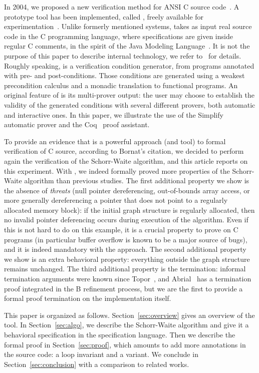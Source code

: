 In 2004, we proposed a new verification method for ANSI C source
code~\cite{filliatre04icfem}.  A prototype tool has been implemented,
called \caduceus{}, freely available for
experimentation~\cite{Caduceus}. Unlike formerly mentioned systems,
\caduceus{} takes as input real source code in the C programming
language, where specifications are given inside regular C comments, in
the spirit of the Java Modeling Language~\cite{leavens00jml}. It is
not the purpose of this paper to describe \caduceus{} internal
technology, we refer to~\cite{filliatre04icfem} for details. Roughly
speaking, \caduceus{} is a verification condition generator, from
programs annotated with pre- and post-conditions. Those conditions are
generated using a weakest precondition calculus and a monadic
translation to functional programs. An original feature of \caduceus{}
is its multi-prover output: the user may choose to establish the
validity of the generated conditions with several different provers,
both automatic and interactive ones. In this paper, we illustrate the
use of the Simplify~\cite{simplify} automatic prover and the
Coq~\cite{CoqProofAssistant} proof assistant.

To provide an evidence that \caduceus{} is a powerful approach (and
tool) to formal verification of C source, according to Bornat's
citation, we decided to perform again the verification of the
Schorr-Waite algorithm, and this article reports on this experiment.
With \caduceus{}, we indeed formally proved more properties of the
Schorr-Waite algorithm than previous studies.  The first additional
property we show is the absence of \emph{threats} (null pointer
dereferencing, out-of-bounds array access, or more generally dereferencing
a pointer that does not point to a regularly allocated memory block):
if the initial graph structure is regularly allocated, then no invalid pointer deferencing occurs during execution
of the algorithm. Even if this is not hard to do on this example, it
is a crucial property to prove on C programs (in particular buffer
overflow is known to be a major source of bugs), and it is indeed
mandatory with the \caduceus{} approach. The second additional
property we show is an extra behavioral property: everything outside
the graph structure remains unchanged. The third additional property is
the termination: informal termination arguments were known
since Topor~\cite{topor79acta}, and Abrial~\cite{abrial03fme} has a
termination proof integrated in the B refinement process, but we are
the first to provide a formal proof termination on the implementation
itself.

This paper is organized as follows.  Section~\ref{sec:overview} gives
an overview of the \caduceus{} tool.  In Section~\ref{sec:algo}, we
describe the Schorr-Waite algorithm and give it a behavioral
specification in the \caduceus{} specification language.  Then we
describe the formal proof in Section~\ref{sec:proof}, which
amounts to add more annotations in the source code: a loop invariant
and a variant. We conclude in Section~\ref{sec:conclusion} with a
comparison to related works.





